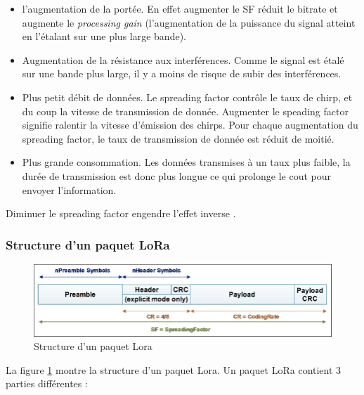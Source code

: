 \begin{itemize}
\item l'augmentation de la portée. En effet augmenter le SF réduit le bitrate et augmente le \textit{processing gain} (l'augmentation de la puissance du signal atteint en l'étalant sur une plus large bande).
\item Augmentation de la résistance aux interférences. Comme le signal est étalé sur une bande plus large, il y a moins de risque de subir des interférences.
\item Plus petit débit de données. Le spreading factor contrôle le taux de chirp, et du coup la vitesse de transmission de donnée. Augmenter le speading factor signifie ralentir la vitesse d'émission des chirps. Pour chaque augmentation du spreading factor, le taux de transmission de donnée est réduit de moitié.
\item Plus grande consommation. Les données transmises à un taux plus faible, la durée de transmission est donc plus longue ce qui prolonge le cout pour envoyer l'information.
\end{itemize}

Diminuer le spreading factor engendre l'effet inverse \cite{thethingsnetworkSF}.


\subsubsection{Structure d'un paquet LoRa}\label{packetlora}

\begin{figure}[h]
\centering

\includegraphics[scale=0.4]{images/lorapacket.png}
\caption{Structure d'un paquet Lora\cite{lorapacket}}\label{term6}
\end{figure}


La figure \ref{term6} montre la structure d'un paquet Lora. Un paquet LoRa contient 3 parties différentes \cite{loraphy} :

\vspace{0.1cm}

